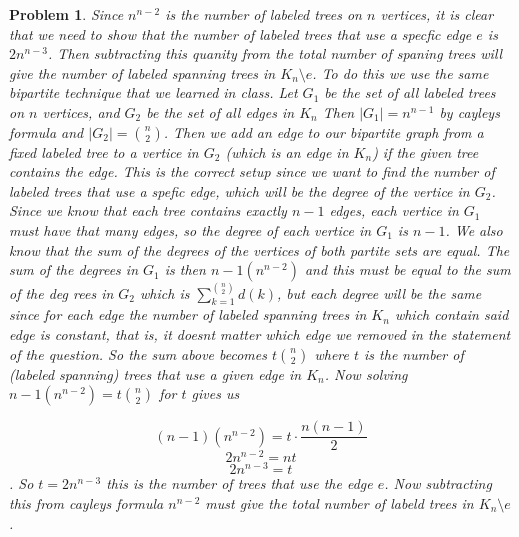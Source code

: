 \documentclass{article}
\newtheorem{prb}{Problem}
\begin{document}
\begin{prb} 
	Since $n^{n-2}$ is the number of labeled trees on $n$ vertices, it is clear that we need to show that the number of labeled trees that use 
	a specfic edge $e$ is $2n^{n-3}$. Then subtracting this quanity from the total number of spaning trees will give the number of labeled spanning 
	trees in $K_n \setminus e$. To do this we use the same bipartite technique that we learned in class. 
	Let $G_1$ be the set of all labeled trees on $n$ vertices, and $G_2$ be the set of all edges in $K_n$
Then $|G_1| = n^{n-1}$ by cayleys formula and $|G_2| = {n \choose 2}$. Then we add an edge to our bipartite graph from a 
	fixed labeled tree to a vertice in $G_2$ (which is an edge in $K_n$) if the given tree contains the edge. This is the correct setup 
	since we want to find the number of labeled trees that use a spefic edge, which will be the degree of the vertice 
	in $G_2$. Since we know that each tree contains exactly $n-1$ edges, each vertice in $G_1$ must have that many edges, so the degree of each vertice in 
	$G_1$ is $n-1$. We also know that the sum of the degrees of the vertices of both partite sets are equal. The sum of the degrees in $G_1$ is then $n-1(n^{n-2})$ and this must be equal to the sum of the deg
	rees in $G_2$ which is $\sum_{k = 1}^{n \choose 2} d(k)$, but each degree will be the same since for each edge the number of labeled spanning trees in $K_n$ which contain said edge is 
	constant, that is, it doesnt matter which edge we removed in the statement of the question. 
	So the sum above becomes $t{n \choose 2}$ where 
	$t$ is the number of (labeled spanning) trees that use a given edge in $K_n$. Now solving $n-1(n^{n-2})  = t {n \choose 2}$ for $t$ gives us 
	
	\[(n-1)(n^{n-2}) = t \cdot \frac{n(n-1)}{2} \]
	\[2n^{n-2} = nt \]
	\[2n^{n-3} = t \].  
	So $t = 2n^{n-3}$ this is the number of trees that use the edge $e$. Now subtracting this from cayleys formula $n^{n-2}$ must give the total number 
	of labeld trees in $K_n\setminus e$. 

\end{prb}
\end{document}

